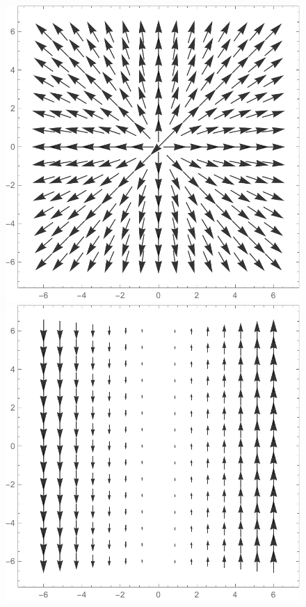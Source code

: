 \begin{Exercise}[difficulty = 2]
\begin{figure}[H]
	\includegraphics[scale=0.41]{fig_Vector_Calc_33b}
	\\
	\includegraphics[scale=0.4]{fig_Vector_Calc_33c}
	\hspace{1.5cm}

\end{figure}
\end{Exercise}
